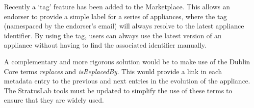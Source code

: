 Recently a `tag' feature has been added to the Marketplace\@.  This
allows an endorser to provide a simple label for a series of
appliances, where the tag (namespaced by the endorser's email) will
always resolve to the latest appliance identifier.  By using the tag,
users can always use the latest version of an appliance without having
to find the associated identifier manually.

A complementary and more rigorous solution would be to make use of the
Dublin Core terms \emph{replaces} and \emph{isReplacedBy}. This would
provide a link in each metadata entry to the previous and next entries
in the evolution of the appliance.  The StratusLab tools must be
updated to simplify the use of these terms to ensure that they are
widely used.
